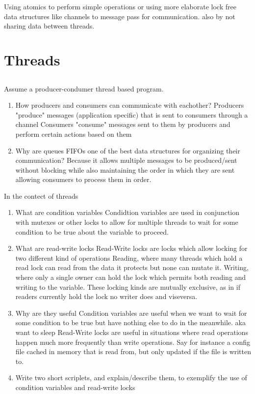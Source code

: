 \documentclass[12pt]{article}
\begin{document}
Using atomics to perform simple operations or using more elaborate lock free data structures like channels to message pass for communication.
also by not sharing data between threads. 


\section{Threads}
\subsection{}
Assume a producer-condumer thread based program. 
\begin{enumerate}
	\item How producers and consumers can communicate with eachother? 
	\subitem Producers "produce" messages (application specific) that is sent to consumers through a channel
	\subitem Consumers "consume" messages sent to them by producers and perform certain actions based on them
	\item Why are queues FIFOs one of the best data structures for organizing their communication?
	\subitem Because it allows multiple messages to be produced/sent without blocking while also maintaining the order in which they are sent allowing consumers to process them in order.
\end{enumerate}

In the contect of threads
\begin{enumerate}
	\item What are condition variables
	\subitem Condidtion variables are used in conjunction with mutexes or other locks to allow for multiple threads to wait for some condition to be true about the variable to proceed. 
	\item What are read-write locks
	\subitem Read-Write locks are locks which allow locking for two different kind of operations
	\subitem Reading, where many threads which hold a read lock can read from the data it protects but none can mutate it.
	\subitem Writing, where only a single owner can hold the lock which permits both reading and writing to the variable.
	\subitem These locking kinds are mutually exclusive, as in if readers currently hold the lock no writer does and viseversa.
	\item Why are they useful
	\subitem Condition variables are useful when we want to wait for some condition to be true but have nothing else to do in the meanwhile. aka want to sleep
	\subitem Read-Write locks are useful in situations where read operations happen much more frequently than write operations. Say for instance a config file cached in memory that is read from, but only updated if the file is written to. 
	\item Write two short scriplets, and explain/describe them, to exemplify the use of condition variables and read-write locks
\end{enumerate}
\end{document}
